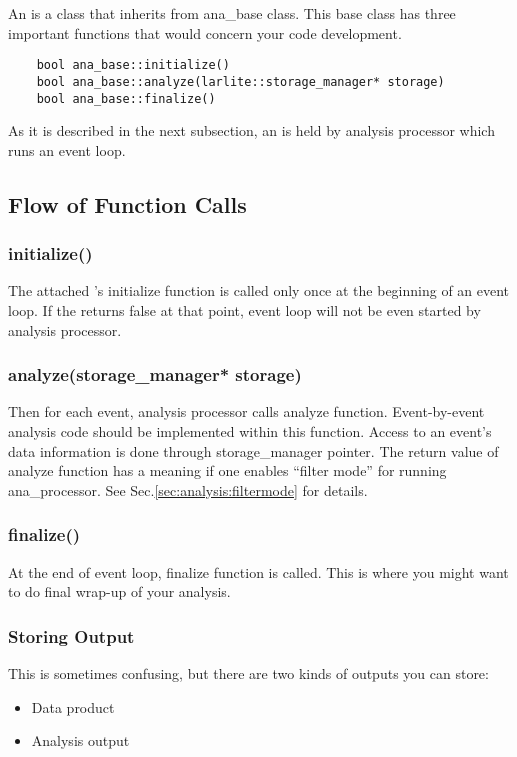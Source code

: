 
An \anaunit is a \CPP class that inherits from {\ttfamily ana\_base} class. 
This base class has three important functions that would concern your \anaunit code development.
\begin{lstlisting}
    bool ana_base::initialize()
    bool ana_base::analyze(larlite::storage_manager* storage)
    bool ana_base::finalize()
\end{lstlisting}
As it is described in the next subsection, an \anaunit is held by analysis processor which runs an event loop.

\subsection{Flow of Function Calls}

\subsubsection{{\ttfamily initialize()}}
The attached \anaunit's {\ttfamily initialize} function is called only once at the beginning of an event loop. 
If the \anaunit returns {\ttfamily false} at that point, event loop will not be even started by analysis processor.

\subsubsection{{\ttfamily analyze(storage\_manager* storage)}}
Then for each event, analysis processor calls {\ttfamily analyze} function. Event-by-event analysis code should be implemented within this function. Access to an event's data information is done through {\ttfamily storage\_manager} pointer. The return value of {\ttfamily analyze} function has a meaning if one enables ``filter mode'' for running {\ttfamily ana\_processor}. See Sec.\ref{sec:analysis:filtermode} for details.

\subsubsection{{\ttfamily finalize()}}
At the end of event loop, {\ttfamily finalize} function is called. This is where you might want to do final wrap-up of your analysis.

\subsubsection{Storing Output}
This is sometimes confusing, but there are two kinds of outputs you can store:
\begin{itemize}
\item Data product
\item Analysis output
\end{itemize}

